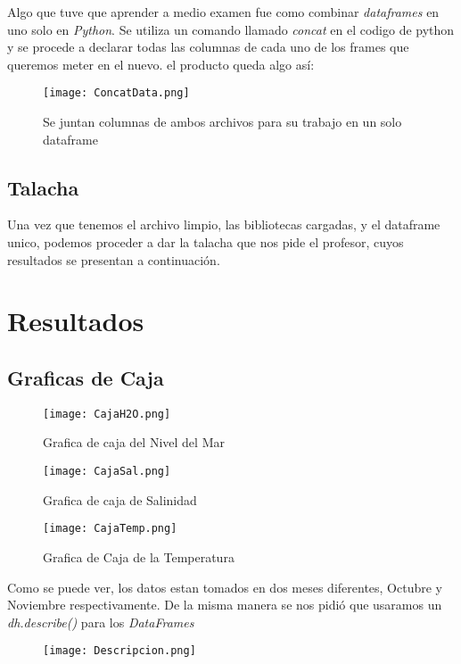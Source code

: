 \documentclass{article}
\begin{document}
Algo que tuve que aprender a medio examen fue como combinar \textit{dataframes} en uno solo en \textit{Python}. 
Se utiliza un comando llamado \textit{concat} en el codigo de python y se procede a declarar todas las columnas de cada uno de los frames que queremos meter en el nuevo. el producto queda algo así:

\begin{figure}[H]
\texttt{[image: ConcatData.png]}
\centering
\caption{Se juntan columnas de ambos archivos para su trabajo en un solo dataframe}
\end{figure}

\subsection{Talacha}
Una vez que tenemos el archivo limpio, las bibliotecas cargadas, y el dataframe unico, podemos proceder a dar la talacha que nos pide el profesor, cuyos resultados se presentan a continuación.

\section{Resultados}
\subsection{Graficas de Caja}

\begin{figure}[H]
\texttt{[image: CajaH2O.png]}
\centering
\caption{Grafica de caja del Nivel del Mar}
\end{figure}

\begin{figure}[H]
\texttt{[image: CajaSal.png]}
\centering
\caption{Grafica de caja de Salinidad}
\end{figure}

\begin{figure}[H]
\texttt{[image: CajaTemp.png]}
\centering
\caption{Grafica de Caja de la Temperatura}
\end{figure}

Como se puede ver, los datos estan tomados en dos meses diferentes, Octubre y Noviembre respectivamente.
\newline
De la misma manera se nos pidió que usaramos un \textit{dh.describe()} para los \textit{DataFrames}

\begin{figure}[H]
\texttt{[image: Descripcion.png]}
\centering
\caption{}
\end{figure}
\end{document}
